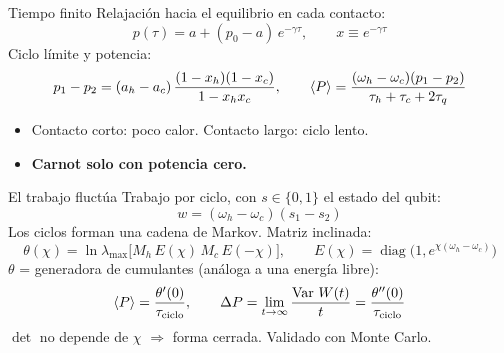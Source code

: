 \begin{frame}{Tiempo finito}
    Relajación hacia el equilibrio en cada contacto:
    \[
        p(\tau) = a + (p_0 - a)\,e^{-\gamma\tau}, \qquad x \equiv e^{-\gamma \tau}
    \]
    Ciclo límite y potencia:
    \[
        p_1 - p_2 = (a_h - a_c)\,\frac{(1-x_h)(1-x_c)}{1 - x_h x_c},
        \qquad
        \langle P \rangle = \frac{(\omega_h-\omega_c)(p_1-p_2)}{\tau_h + \tau_c + 2\tau_q}
    \]
    \begin{itemize}
        \item Contacto corto: poco calor. Contacto largo: ciclo lento.
        \item \textbf{Carnot solo con potencia cero.}
    \end{itemize}
\end{frame}

\begin{frame}{El trabajo fluctúa}
    Trabajo por ciclo, con $s\in\{0,1\}$ el estado del qubit:
    \[
        w = (\omega_h - \omega_c)(s_1 - s_2)
    \]
    Los ciclos forman una cadena de Markov. Matriz inclinada:
    \[
        \theta(\chi) = \ln \lambda_{\max}\!\big[M_h\, E(\chi)\, M_c\, E(-\chi)\big],
        \qquad E(\chi) = \operatorname{diag}\!\big(1, e^{\chi(\omega_h-\omega_c)}\big)
    \]
    $\theta$ = generadora de cumulantes (análoga a una energía libre):
    \[
        \langle P \rangle = \frac{\theta'(0)}{\tau_{\text{ciclo}}},\qquad
        \Delta P = \lim_{t\to\infty}\frac{\operatorname{Var}\,W(t)}{t} = \frac{\theta''(0)}{\tau_{\text{ciclo}}}
    \]
    {\small $\det$ no depende de $\chi$ $\Rightarrow$ forma cerrada. Validado con Monte Carlo.}
\end{frame}
